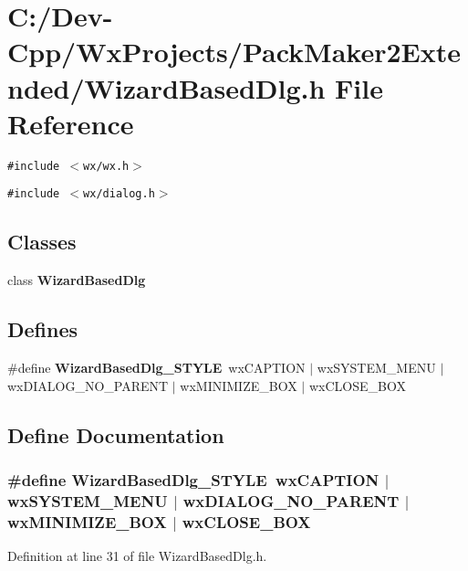 \section{C:/Dev-Cpp/Wx\-Projects/Pack\-Maker2Extended/Wizard\-Based\-Dlg.h File Reference}
\label{_wizard_based_dlg_8h}
{\tt \#include $<$wx/wx.h$>$}\par
{\tt \#include $<$wx/dialog.h$>$}\par
\subsection*{Classes}
\begin{CompactItemize}
\item 
class {\bf Wizard\-Based\-Dlg}
\end{CompactItemize}
\subsection*{Defines}
\begin{CompactItemize}
\item 
\#define {\bf Wizard\-Based\-Dlg\_\-STYLE}~wx\-CAPTION $|$ wx\-SYSTEM\_\-MENU $|$ wx\-DIALOG\_\-NO\_\-PARENT $|$ wx\-MINIMIZE\_\-BOX $|$ wx\-CLOSE\_\-BOX
\end{CompactItemize}


\subsection{Define Documentation}
\subsubsection{\setlength{\rightskip}{0pt plus 5cm}\#define Wizard\-Based\-Dlg\_\-STYLE~wx\-CAPTION $|$ wx\-SYSTEM\_\-MENU $|$ wx\-DIALOG\_\-NO\_\-PARENT $|$ wx\-MINIMIZE\_\-BOX $|$ wx\-CLOSE\_\-BOX}\label{_wizard_based_dlg_8h_05d390103dac5699aff9bda5b2d7253a}




Definition at line 31 of file Wizard\-Based\-Dlg.h.